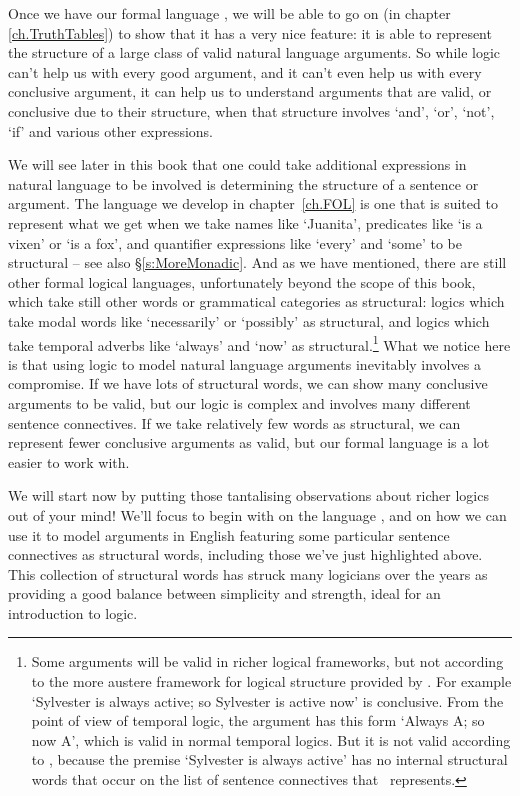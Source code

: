 Once we have our formal language \TFL, we will be able to go on (in chapter \ref{ch.TruthTables}) to show that it has a very nice feature: it is able to represent the structure of a large class of valid natural language arguments. So while logic can't help us with every good argument, and it can't even help us with every conclusive argument, it can help us to understand arguments that are valid, or conclusive due to their structure, when that structure involves  `and', `or', `not', `if' and various other expressions. 

We will see later in this book that one could take additional  expressions in natural language to be involved is determining the structure of a sentence or argument. The language we develop in chapter~\ref{ch.FOL} is one that is suited to represent what we get when we take names like `Juanita', predicates like `is a vixen' or `is a fox', and quantifier expressions like `every' and `some' to be structural – see also §\ref{s:MoreMonadic}. And as we have mentioned, there are still other formal logical languages, unfortunately beyond the scope of this book, which take still other words or grammatical categories as structural: logics which take modal words like `necessarily' or `possibly' as structural, and logics which take temporal adverbs like `always' and `now' as structural.\footnote{Some arguments will be valid in richer logical frameworks, but not according to the more austere framework for logical structure provided by \TFL. For example `Sylvester is always active; so Sylvester is active now' is conclusive. From the point of view of temporal logic, the argument has this form `Always A; so now A', which is valid in normal temporal logics. But it is not valid according to \TFL, because the premise `Sylvester is always active' has no internal structural words that occur on the list of sentence connectives that \TFL\ represents.} What we notice here is that using logic to model natural language arguments inevitably involves a compromise. If we have lots of structural words, we can show many conclusive arguments to be valid, but our logic is complex and involves many different sentence connectives. If we take relatively few words as structural, we can represent fewer conclusive arguments as valid, but our formal language is a lot easier to work with. 

We will start now by putting those tantalising observations about richer logics out of your mind! We'll focus to begin with on the language \TFL, and on how we can use it to model arguments in English featuring some particular sentence connectives as structural words, including those we've just highlighted above. This collection of structural words has struck many logicians over the years as providing a good balance between simplicity and strength, ideal for an introduction to logic.


